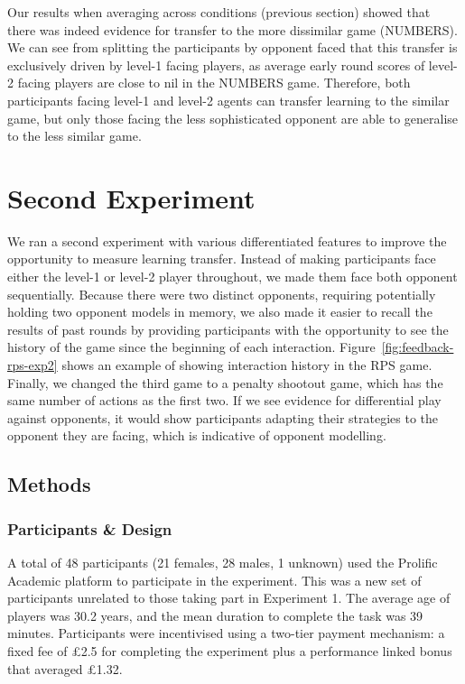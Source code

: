 \documentclass[man,floatsintext]{apa6}
\begin{document}
Our results when averaging across conditions (previous section) showed that there was indeed evidence for transfer to the more dissimilar game (NUMBERS). We can see from splitting the participants by opponent faced that this transfer is exclusively driven by level-1 facing players, as average early round scores of level-2 facing players are close to nil in the NUMBERS game. Therefore, both participants facing level-1 and level-2 agents can transfer learning to the similar game, but only those facing the less sophisticated opponent are able to generalise to the less similar game.

\newpage

\hypertarget{second-experiment}{%
\section{Second Experiment}\label{second-experiment}}

We ran a second experiment with various differentiated features to improve the opportunity to measure learning transfer. Instead of making participants face either the level-1 or level-2 player throughout, we made them face both opponent sequentially. Because there were two distinct opponents, requiring potentially holding two opponent models in memory, we also made it easier to recall the results of past rounds by providing participants with the opportunity to see the history of the game since the beginning of each interaction. Figure~\ref{fig:feedback-rps-exp2} shows an example of showing interaction history in the RPS game. Finally, we changed the third game to a penalty shootout game, which has the same number of actions as the first two. If we see evidence for differential play against opponents, it would show participants adapting their strategies to the opponent they are facing, which is indicative of opponent modelling.

\hypertarget{methods-1}{%
\subsection{Methods}\label{methods-1}}

\hypertarget{participants-design}{%
\subsubsection{Participants \& Design}\label{participants-design}}

A total of 48 participants (21 females, 28 males, 1 unknown) used the Prolific Academic platform to participate in the experiment. This was a new set of participants unrelated to those taking part in Experiment 1. The average age of players was 30.2 years, and the mean duration to complete the task was 39 minutes. Participants were incentivised using a two-tier payment mechanism: a fixed fee of £2.5 for completing the experiment plus a performance linked bonus that averaged £1.32.
\end{document}
